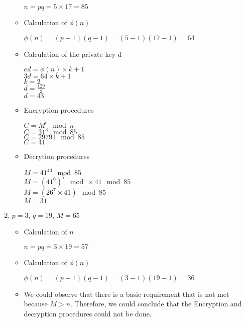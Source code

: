 \documentclass[12]{article}
\begin{document}
\begin{enumerate}
\begin{itemize}
			$n = pq = 5 \times 17 = 85$
			
			\item Calculation of $\phi(n)$
			
			$ \phi(n) = ( p - 1)(q - 1) = ( 5 - 1 )( 17 - 1 ) = 64$ \\
			
			\item Calculation of the private key d
			
			$ed = \phi(n)  \times k + 1$ \\
			$3d =  64 \times k + 1 $	\\
			$k = 2$ \\
			$d =  \frac{129}{3}$ \\
			$d = 43$
			
			\item  Encryption procedures
			
			$C = M^e \mod  n$ \\
			$C = 31^3 \mod 85$\\
			$C = 29791 \mod 85$ \\
			$C = 41$
				
			\item Decrytion procedures
			
			$M = 41^{43} \mod 85$ \\
			$M = ( 41^6)^7 \mod \times 41 \mod 85$ \\
			$M = ( 26^7 \times 41 ) \mod  85$ \\
			$M =  31$
		
		\end{itemize}				 	
			
			
			\item $p = 3$, $q = 19$, $ M = 65$ 
			
				\begin{itemize}
				
					\item Calculation of $n$
					
					$n = pq =  3 \times 19  = 57$ \\
					
					\item Calculation of $\phi(n)$
					
					$\phi(n) = ( p - 1)( q - 1 ) = ( 3 - 1 )( 19 - 1 ) = 36$
					
					\item We could observe that there is a basic requirement that is not met because $M > n$. Therefore, we could conclude that the Encryption and decryption procedures could not be done.
					
				\end{itemize}
				
\end{enumerate}
\end{document}
